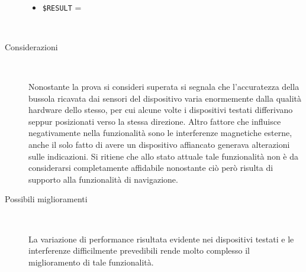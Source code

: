 \documentclass[../../SperimentazioniPratiche.tex]{subfiles}
\begin{document}
\begin{tcolorbox}[fonttitle=\bfseries, 
								adjusted title={\Large Prova 16A.1}, 
								breakable, 
								sharp corners=south,
								colback=white, 
								colframe=white!60!black]
\begin{description}[leftmargin=0.7cm,labelwidth=!]
\begin{description}
        					\item[\dispositivoC] \ \par
        					\begin{itemize}
        						\item \verb|$RESULT| = \ok
        					\end{itemize}
        					
        				\end{description}
        				
        			\tcbline
        			
        			\item[Analisi risultati] \ \par
        				\begin{description}
        					\item[Considerazioni] \ \par
        						Nonostante la prova si consideri superata si segnala che l'accuratezza della bussola ricavata dai sensori del dispositivo varia enormemente dalla qualità hardware dello stesso, per cui alcune volte i dispositivi testati differivano seppur posizionati verso la stessa direzione. Altro fattore che influisce negativamente nella funzionalità sono le interferenze magnetiche esterne, anche il solo fatto di avere un dispositivo affiancato generava alterazioni sulle indicazioni. Si ritiene che allo stato attuale tale funzionalità non è da considerarsi completamente affidabile nonostante ciò però risulta di supporto alla funzionalità di navigazione.
        						
        					\item[Possibili miglioramenti] \ \par 
        						La variazione di performance risultata evidente nei dispositivi testati e le interferenze difficilmente prevedibili rende molto complesso il miglioramento di tale funzionalità. 
        				\end{description}

        				
				\end{description}  
				
			\end{tcolorbox}
			
			\newpage		
\end{document}
